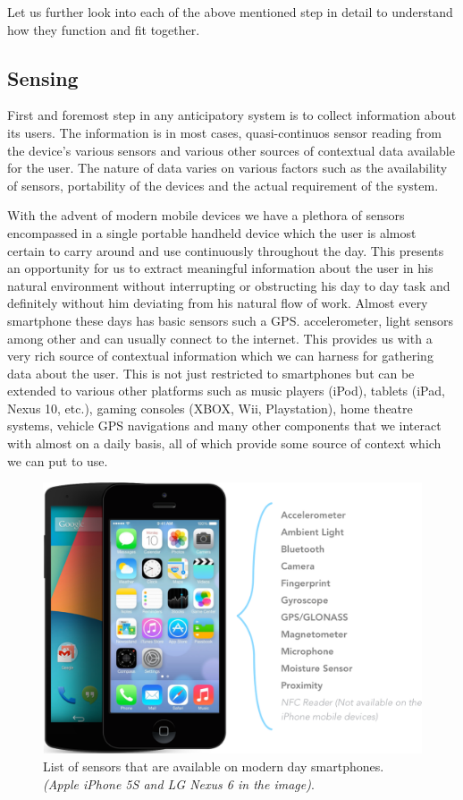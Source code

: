 \documentclass[12pt]{report}
\begin{document}
Let us further look into each of the above mentioned step in detail to understand how they function and fit together.

\subsection{Sensing}
First and foremost step in any anticipatory system is to collect information about its users. The information is in most cases, quasi-continuos sensor reading from the device's various sensors and various other sources of contextual data available for the user. The nature of data varies on various factors such as the availability of sensors, portability of the devices and the actual requirement of the system.

With the advent of modern mobile devices we have a plethora of sensors encompassed in a single portable handheld device which the user is almost certain to carry around and use continuously throughout the day. This presents an opportunity for us to extract meaningful information about the user in his natural environment without interrupting or obstructing his day to day task and definitely without him deviating from his natural flow of work. Almost every smartphone these days has basic sensors such a GPS. accelerometer, light sensors among other and can usually connect to the internet. This provides us with a very rich source of contextual information which we can harness for gathering data about the user. This is not just restricted to smartphones but can be extended to various other platforms such as music players (iPod), tablets (iPad, Nexus 10, etc.), gaming consoles (XBOX, Wii, Playstation), home theatre systems, vehicle GPS navigations and many other components that we interact with almost on a daily basis, all of which provide some source of context which we can put to use.

\begin{figure}[hbtp]
 \centering
 \includegraphics[width=120mm]{Sensor_List.png}
  \caption[Sensors on modern day smartphones.]{List of sensors that are available on modern day smartphones. \textit{(Apple iPhone 5S and LG Nexus 6 in the image)}.}
 \label{figure:SensorInformation}
\end{figure}
\end{document}
